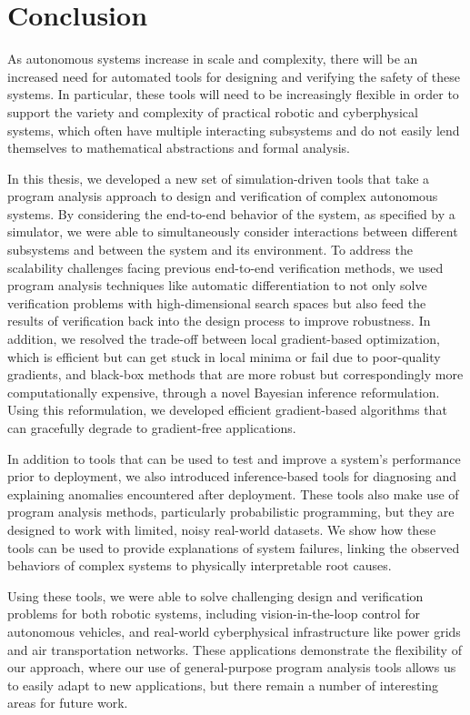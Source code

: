 \chapter{Conclusion}\label{section:conclusion}

As autonomous systems increase in scale and complexity, there will be an increased need for automated tools for designing and verifying the safety of these systems. In particular, these tools will need to be increasingly flexible in order to support the variety and complexity of practical robotic and cyberphysical systems, which often have multiple interacting subsystems and do not easily lend themselves to mathematical abstractions and formal analysis.

In this thesis, we developed a new set of simulation-driven tools that take a program analysis approach to design and verification of complex autonomous systems. By considering the end-to-end behavior of the system, as specified by a simulator, we were able to simultaneously consider interactions between different subsystems and between the system and its environment. To address the scalability challenges facing previous end-to-end verification methods, we used program analysis techniques like automatic differentiation to not only solve verification problems with high-dimensional search spaces but also feed the results of verification back into the design process to improve robustness. In addition, we resolved the trade-off between local gradient-based optimization, which is efficient but can get stuck in local minima or fail due to poor-quality gradients, and black-box methods that are more robust but correspondingly more computationally expensive, through a novel Bayesian inference reformulation. Using this reformulation, we developed efficient gradient-based algorithms that can gracefully degrade to gradient-free applications.

In addition to tools that can be used to test and improve a system's performance prior to deployment, we also introduced inference-based tools for diagnosing and explaining anomalies encountered after deployment. These tools also make use of program analysis methods, particularly probabilistic programming, but they are designed to work with limited, noisy real-world datasets. We show how these tools can be used to provide explanations of system failures, linking the observed behaviors of complex systems to physically interpretable root causes.

Using these tools, we were able to solve challenging design and verification problems for both robotic systems, including vision-in-the-loop control for autonomous vehicles, and real-world cyberphysical infrastructure like power grids and air transportation networks. These applications demonstrate the flexibility of our approach, where our use of general-purpose program analysis tools allows us to easily adapt to new applications, but there remain a number of interesting areas for future work.


